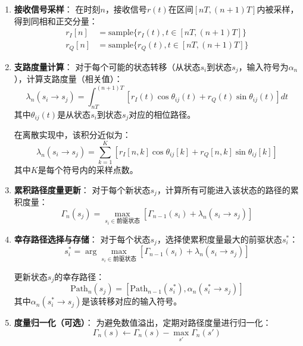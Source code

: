 \documentclass[12pt,a4paper,twoside]{article}
\numberwithin{equation}{section}
\begin{document}
\begin{enumerate}
    \item \textbf{接收信号采样}：
    在时刻$n$，接收信号$r(t)$在区间$[nT, (n+1)T]$内被采样，得到同相和正交分量：
    \begin{align}
        r_I[n] &= \text{sample}\{r_I(t), t \in [nT, (n+1)T]\} \\
        r_Q[n] &= \text{sample}\{r_Q(t), t \in [nT, (n+1)T]\}
    \end{align}
    
    \item \textbf{支路度量计算}：
    对于每个可能的状态转移（从状态$s_i$到状态$s_j$，输入符号为$\alpha_n$），计算支路度量（相关值）：
    \begin{equation}
        \lambda_n(s_i \rightarrow s_j) = \int_{nT}^{(n+1)T} \left[ r_I(t)\cos\theta_{ij}(t) + r_Q(t)\sin\theta_{ij}(t) \right] dt
    \end{equation}
    其中$\theta_{ij}(t)$是从状态$s_i$到状态$s_j$对应的相位路径。
    
    在离散实现中，该积分近似为：
    \begin{equation}
        \lambda_n(s_i \rightarrow s_j) = \sum_{k=1}^{K} \left[ r_I[n,k]\cos\theta_{ij}[k] + r_Q[n,k]\sin\theta_{ij}[k] \right]
    \end{equation}
    其中$K$是每个符号内的采样点数。
    
    \item \textbf{累积路径度量更新}：
    对于每个新状态$s_j$，计算所有可能进入该状态的路径的累积度量：
    \begin{equation}
        \Gamma_n(s_j) = \max_{s_i \in \text{前驱状态}} \left[ \Gamma_{n-1}(s_i) + \lambda_n(s_i \rightarrow s_j) \right]
    \end{equation}
    
    \item \textbf{幸存路径选择与存储}：
    对于每个状态$s_j$，选择使累积度量最大的前驱状态$s_i^*$：
    \begin{equation}
        s_i^* = \arg\max_{s_i \in \text{前驱状态}} \left[ \Gamma_{n-1}(s_i) + \lambda_n(s_i \rightarrow s_j) \right]
    \end{equation}
    
    更新状态$s_j$的幸存路径：
    \begin{equation}
        \text{Path}_n(s_j) = [\text{Path}_{n-1}(s_i^*), \alpha_n(s_i^* \rightarrow s_j)]
    \end{equation}
    其中$\alpha_n(s_i^* \rightarrow s_j)$是该转移对应的输入符号。
    
    \item \textbf{度量归一化（可选）}：
    为避免数值溢出，定期对路径度量进行归一化：
    \begin{equation}
        \Gamma_n(s) \leftarrow \Gamma_n(s) - \max_{s'} \Gamma_n(s')
    \end{equation}
\end{enumerate}
\end{document}
